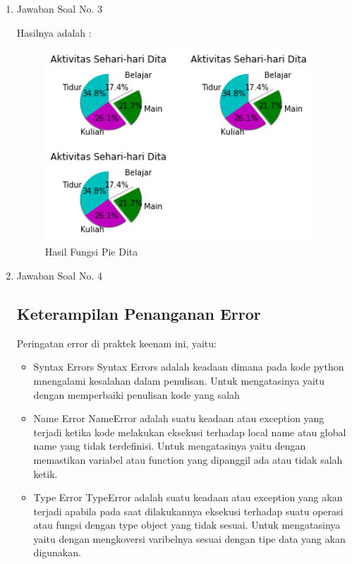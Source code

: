 \begin{enumerate}
\item Jawaban Soal No. 3

Hasilnya adalah : 
\begin{figure}[H]
	\includegraphics[width=10cm]{figures/6/1174054/Praktek/pie.png}
	\centering
	\caption{Hasil Fungsi Pie Dita}
\end{figure}

\item Jawaban Soal No. 4


\subsection{Keterampilan Penanganan Error}

Peringatan error di praktek keenam ini, yaitu:
\begin{itemize}
\item Syntax Errors
Syntax Errors adalah keadaan dimana pada kode python mnengalami kesalahan dalam penulisan. Untuk mengatasinya yaitu dengan memperbaiki penulisan kode yang salah 

\item Name Error
NameError adalah suatu keadaan atau exception yang terjadi ketika kode melakukan eksekusi terhadap local name atau global name yang tidak terdefinisi. Untuk mengatasinya yaitu dengan memastikan variabel atau function yang dipanggil ada atau tidak salah ketik.

\item Type Error
TypeError adalah suatu keadaan atau exception yang akan terjadi apabila pada saat dilakukannya eksekusi terhadap suatu operasi atau fungsi dengan type object yang tidak sesuai. Untuk mengatasinya yaitu dengan mengkoversi varibelnya sesuai dengan tipe data yang akan digunakan.
\end{itemize}


\end{enumerate}
